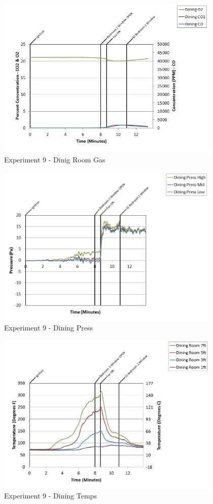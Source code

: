 \documentclass{article}
\begin{document}
\begin{appendices}
\clearpage

\begin{figure}[h!]
	\centering
	\includegraphics[height=3.05in]{0_Images/Results_Charts/Exp_9_Charts/DinigRoomGas.png}
	\caption{Experiment 9 - Dinig Room Gas}
\end{figure}


\begin{figure}[h!]
	\centering
	\includegraphics[height=3.05in]{0_Images/Results_Charts/Exp_9_Charts/DiningPress.png}
	\caption{Experiment 9 - Dining Press}
\end{figure}

\clearpage

\begin{figure}[h!]
	\centering
	\includegraphics[height=3.05in]{0_Images/Results_Charts/Exp_9_Charts/DiningTemps.png}
	\caption{Experiment 9 - Dining Temps}
\end{figure}



\end{appendices}
\end{document}
